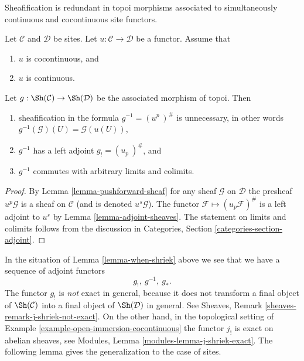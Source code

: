 \begin{lemma}
\label{lemma-when-shriek}
\begin{slogan}
Sheafification is redundant in topoi morphisms associated to simultaneously
continuous and cocontinuous site functors.
\end{slogan}
Let $\mathcal{C}$ and $\mathcal{D}$ be sites.
Let $u : \mathcal{C} \to \mathcal{D}$ be a functor.
Assume that
\begin{enumerate}
\item[(a)] $u$ is cocontinuous, and
\item[(b)] $u$ is continuous.
\end{enumerate}
Let $g : \Sh(\mathcal{C}) \to \Sh(\mathcal{D})$
be the associated morphism of topoi. Then
\begin{enumerate}
\item sheafification in the formula $g^{-1} = (u^p\ )^\#$ is
unnecessary, in other words $g^{-1}(\mathcal{G})(U) = \mathcal{G}(u(U))$,
\item $g^{-1}$ has a left adjoint $g_{!} = (u_p\ )^\#$, and
\item $g^{-1}$ commutes with arbitrary limits and colimits.
\end{enumerate}
\end{lemma}

\begin{proof}
By Lemma \ref{lemma-pushforward-sheaf} for any sheaf $\mathcal{G}$
on $\mathcal{D}$ the presheaf $u^p\mathcal{G}$ is a sheaf on $\mathcal{C}$
(and is denoted $u^s\mathcal{G}$). The functor
$\mathcal{F} \mapsto (u_p\mathcal{F})^\#$ is a left
adjoint to $u^s$ by Lemma \ref{lemma-adjoint-sheaves}.
The statement on limits and colimits follows from the
discussion in Categories, Section \ref{categories-section-adjoint}.
\end{proof}

\noindent
In the situation of Lemma \ref{lemma-when-shriek} above we see that we have
a sequence of adjoint functors
$$
g_{!}, \ g^{-1}, \ g_*.
$$
The functor $g_!$ is {\it not} exact in general, because it does
not transform a final object of $\Sh(\mathcal{C})$
into a final object of $\Sh(\mathcal{D})$ in general.
See Sheaves, Remark \ref{sheaves-remark-j-shriek-not-exact}.
On the other hand, in the topological setting of
Example \ref{example-open-immersion-cocontinuous} the functor
$j_!$ is exact on abelian sheaves, see
Modules, Lemma \ref{modules-lemma-j-shriek-exact}. The following lemma gives
the generalization to the case of sites.

